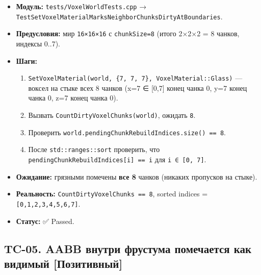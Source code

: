 \documentclass[
  11pt,a4paper,oneside]{article}
\providecommand{\tightlist}{%
  \setlength{\itemsep}{0pt}\setlength{\parskip}{0pt}}
\providecommand{\tightlist}{%
  \setlength{\itemsep}{0pt}\setlength{\parskip}{0pt}}
\begin{document}
\begin{itemize}
\tightlist
\item
  \textbf{Модуль:} \texttt{tests/VoxelWorldTests.cpp} → \texttt{TestSetVoxelMaterialMarksNeighborChunksDirtyAtBoundaries}.
\item
  \textbf{Предусловия:} мир \texttt{16×16×16} с \texttt{chunkSize=8} (итого 2×2×2 = 8 чанков, индексы 0..7).
\item
  \textbf{Шаги:}

  \begin{enumerate}
  \def\labelenumi{\arabic{enumi}.}
  \tightlist
  \item
    \texttt{SetVoxelMaterial(world,\ \{7,\ 7,\ 7\},\ VoxelMaterial::Glass)} --- воксел на стыке всех 8 чанков (x=7 ∈ {[}0,7{]} конец чанка 0, y=7 конец чанка 0, z=7 конец чанка 0).
  \item
    Вызвать \texttt{CountDirtyVoxelChunks(world)}, ожидать \texttt{8}.
  \item
    Проверить \texttt{world.pendingChunkRebuildIndices.size()\ ==\ 8}.
  \item
    После \texttt{std::ranges::sort} проверить, что \texttt{pendingChunkRebuildIndices{[}i{]}\ ==\ i} для \texttt{i\ ∈\ {[}0,\ 7{]}}.
  \end{enumerate}
\item
  \textbf{Ожидание:} грязными помечены \textbf{все 8} чанков (никаких пропусков на стыке).
\item
  \textbf{Реальность:} \texttt{CountDirtyVoxelChunks\ ==\ 8}, sorted indices = \texttt{{[}0,1,2,3,4,5,6,7{]}}.
\item
  \textbf{Статус:} ✅ Passed.
\end{itemize}

\subsection{TC-05. AABB внутри фрустума помечается как видимый {[}Позитивный{]}}\label{tc-05-aabb-ux432ux43dux443ux442ux440ux438-ux444ux440ux443ux441ux442ux443ux43cux430-ux43fux43eux43cux435ux447ux430ux435ux442ux441ux44f-ux43aux430ux43a-ux432ux438ux434ux438ux43cux44bux439-ux43fux43eux437ux438ux442ux438ux432ux43dux44bux439}
\end{document}
